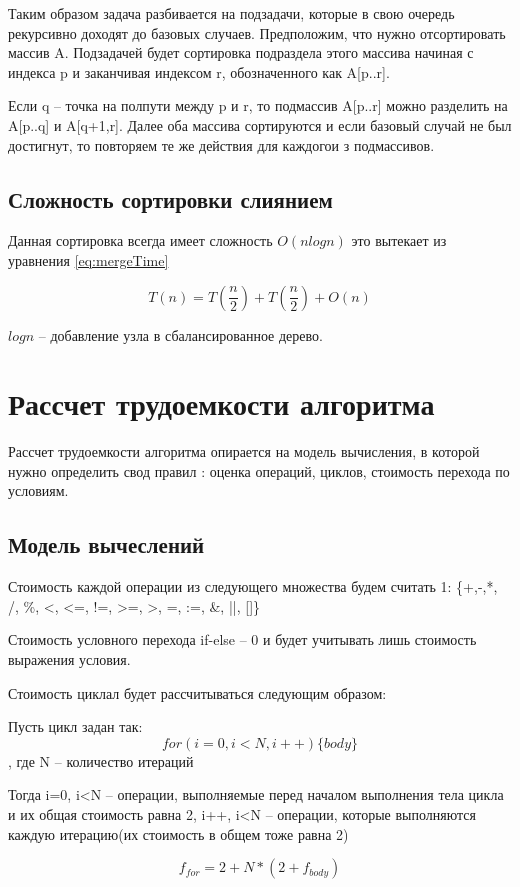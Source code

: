 Таким образом задача разбивается на подзадачи, которые в свою очередь рекурсивно доходят до базовых случаев. Предположим, что нужно отсортировать массив A. Подзадачей будет сортировка подраздела этого массива начиная с индекса p и заканчивая индексом r, обозначенного как A[p..r].

Если q -- точка на полпути между p и r, то подмассив A[p..r] можно разделить на A[p..q] и A[q+1,r]. Далее оба массива сортируются и если базовый случай не был достигнут, то повторяем те же действия для каждогои з подмассивов.

\subsection{ Сложность сортировки слиянием\cite{bib1}}
Данная сортировка всегда имеет сложность $O(n log n)$ это вытекает из уравнения \ref{eq:mergeTime}

\begin{equation}
    T(n) = T(\frac{n}{2}) + T(\frac{n}{2}) + O(n)
    \label{eq:mergeTime}
\end{equation}

$log n$ -- добавление узла в сбалансированное дерево.

\section{ Рассчет трудоемкости алгоритма}

Рассчет трудоемкости алгоритма опирается на модель вычисления, в которой нужно определить свод правил : оценка операций, циклов, стоимость перехода по условиям.

\subsection{Модель вычеслений}

Стоимость каждой операции из следующего множества будем считать 1:
\{+,-,*, /, \%, <, <=, !=, >=, >, =, :=, \&, ||, []\}

Стоимость условного перехода if-else -- 0 и будет учитывать лишь стоимость выражения условия.

Стоимость циклал будет рассчитываться следующим образом:

Пусть цикл задан так:
\begin{equation}
        for(i=0, i<N, i++) \{ body \}
\end{equation}
, где N -- количество итераций

Тогда
i=0, i<N -- операции, выполняемые перед началом выполнения тела цикла и их общая стоимость равна 2, 
i++, i<N -- операции, которые выполняются каждую итерацию(их стоимость в общем тоже равна 2)

\begin{equation}
    f_{for} = 2 + N*(2 + f_{body})
\end{equation}
